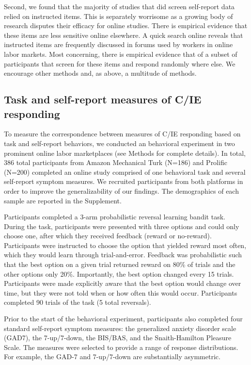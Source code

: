 \documentclass[a4paper,notitlepage,12pt]{article}
\begin{document}
Second, we found that the majority of studies that did screen self-report data relied on instructed items. This is separately worrisome as a growing body of research disputes their efficacy for online studies. There is empirical evidence that these items are less sensitive online elsewhere. A quick search online reveals that instructed items are frequently discussed in forums used by workers in online labor markets. Most concerning, there is empirical evidence that of a subset of participants that screen for these items and respond randomly where else. We encourage other methods and, as above, a multitude of methods. 

\subsection{Task and self-report measures of C/IE responding}

To measure the correspondence between measures of C/IE responding based on task and self-report behaviors, we conducted an behavioral experiment in two prominent online labor marketplaces (see Methods for complete details). In total, 386 total participants from Amazon Mechanical Turk (N=186) and Prolific (N=200) completed an online study comprised of one behavioral task and several self-report symptom measures. We recruited participants from both platforms in order to improve the generalizability of our findings. The demographics of each sample are reported in the Supplement.

Participants completed a 3-arm probabilistic reversal learning bandit task. During the task, participants were presented with three options and could only choose one, after which they received feedback (reward or no-reward). Participants were instructed to choose the option that yielded reward most often, which they would learn through trial-and-error. Feedback was probabilistic such that the best option on a given trial returned reward on 80\% of trials and the other options only 20\%. Importantly, the best option changed every 15 trials. Participants were made explicitly aware that the best option would change over time, but they were not told when or how often this would occur. Participants completed 90 trials of the task (5 total reversals). 
 
Prior to the start of the behavioral experiment, participants also completed four standard self-report symptom measures: the generalized anxiety disorder scale (GAD7), the 7-up/7-down, the BIS/BAS, and the Snaith-Hamilton Pleasure Scale. The measures were selected to provide a range of response distributions. For example, the GAD-7 and 7-up/7-down are substantially asymmetric.
\end{document}
